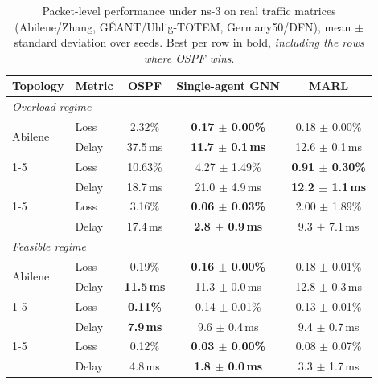 \begin{table}[htbp]
  \centering
  \caption{Packet-level performance under ns-3 on real traffic matrices
  (Abilene/Zhang, GÉANT/Uhlig-TOTEM, Germany50/DFN), mean $\pm$ standard
  deviation over seeds. Best per row in bold, \emph{including the rows where
  OSPF wins}.}
  \label{tab:qos}
  \begin{tabular}{llccc}
    \toprule
    Topology & Metric & OSPF & Single-agent GNN & MARL \\
    \midrule
    \multicolumn{5}{l}{\emph{Overload regime}} \\
    \midrule
    \multirow{2}{*}{Abilene}   & Loss  & 2.32\%   & \textbf{0.17 $\pm$ 0.00\%}  & 0.18 $\pm$ 0.00\%  \\
                               & Delay & 37.5\,ms & \textbf{11.7 $\pm$ 0.1\,ms} & 12.6 $\pm$ 0.1\,ms \\
    \cmidrule(l){1-5}
    \multirow{2}{*}{GÉANT}     & Loss  & 10.63\%  & 4.27 $\pm$ 1.49\%   & \textbf{0.91 $\pm$ 0.30\%}  \\
                               & Delay & 18.7\,ms & 21.0 $\pm$ 4.9\,ms  & \textbf{12.2 $\pm$ 1.1\,ms} \\
    \cmidrule(l){1-5}
    \multirow{2}{*}{Germany50} & Loss  & 3.16\%   & \textbf{0.06 $\pm$ 0.03\%} & 2.00 $\pm$ 1.89\% \\
                               & Delay & 17.4\,ms & \textbf{2.8 $\pm$ 0.9\,ms} & 9.3 $\pm$ 7.1\,ms \\
    \midrule
    \multicolumn{5}{l}{\emph{Feasible regime}} \\
    \midrule
    \multirow{2}{*}{Abilene}   & Loss  & 0.19\%            & \textbf{0.16 $\pm$ 0.00\%} & 0.18 $\pm$ 0.01\%  \\
                               & Delay & \textbf{11.5\,ms} & 11.3 $\pm$ 0.0\,ms         & 12.8 $\pm$ 0.3\,ms \\
    \cmidrule(l){1-5}
    \multirow{2}{*}{GÉANT}     & Loss  & \textbf{0.11\%}  & 0.14 $\pm$ 0.01\% & 0.13 $\pm$ 0.01\% \\
                               & Delay & \textbf{7.9\,ms} & 9.6 $\pm$ 0.4\,ms & 9.4 $\pm$ 0.7\,ms \\
    \cmidrule(l){1-5}
    \multirow{2}{*}{Germany50} & Loss  & 0.12\%  & \textbf{0.03 $\pm$ 0.00\%} & 0.08 $\pm$ 0.07\% \\
                               & Delay & 4.8\,ms & \textbf{1.8 $\pm$ 0.0\,ms} & 3.3 $\pm$ 1.7\,ms \\
    \bottomrule
  \end{tabular}
\end{table}

